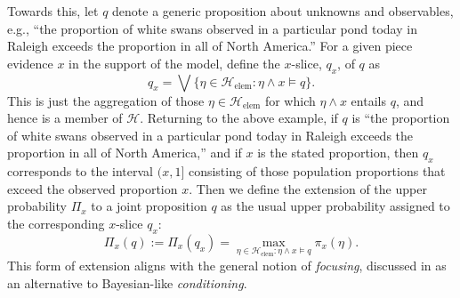 \documentclass[a4paper, 12pt]{article}
\theoremstyle{plain}
\theoremstyle{definition}
\theoremstyle{remark}
\renewcommand{\H}{\mathcal{H}}
\newcommand{\uPi}{\mathsf{\Pi}}%
\begin{document}
Towards this, let $q$ denote a generic proposition about unknowns and observables, e.g., ``the proportion of white swans observed in a particular pond today in Raleigh exceeds the proportion in all of North America.''  For a given piece evidence $x$ in the support of the model, define the $x$-slice, $q_x$, of $q$ as 
\[ q_x = \bigvee \{\eta \in \H_\text{elem}: \eta \land x \models q\}. \]
This is just the aggregation of those $\eta \in \H_\text{elem}$ for which $\eta \land x$ entails $q$, and hence is a member of $\H$.  Returning to the above example, if $q$ is ``the proportion of white swans observed in a particular pond today in Raleigh exceeds the proportion in all of North America,'' and if $x$ is the stated proportion, then $q_x$ corresponds to the interval $(x, 1]$ consisting of those population proportions that exceed the observed proportion $x$.  Then we define the extension of the upper probability $\uPi_x$ to a joint proposition $q$ as the usual upper probability assigned to the corresponding $x$-slice $q_x$:
\[ \uPi_x(q) := \uPi_x(q_x) = \max_{\eta \in \H_\text{elem}: \eta \land x \models q} \pi_x(\eta). \]
This form of extension aligns with the general notion of {\em focusing}, discussed in \citet[][Sec.~5.1]{martin.partial2} as an alternative to Bayesian-like {\em conditioning}. 
\end{document}
